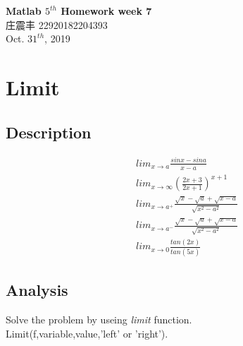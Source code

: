 \documentclass[UTF8,a4paper]{article}
\begin{document}
\begin{center}
    \textbf{\LARGE{Matlab $5^{th}$ Homework week 7}}\\[0.5cm]
    \normalsize{庄震丰 22920182204393}\\[0.5cm]
    \large{Oct. $31^{th}$, 2019}
\end{center}
\section{Limit}
\subsection{Description}
 
$$
\begin{aligned}
    &lim_{x \rightarrow a} \frac{sinx-sina}{x-a}\\
    &lim_{x\rightarrow \infty} (\frac{2x+3}{2x+1})^{x+1}\\
    &lim_{x\rightarrow a^{+}} \frac{\sqrt{x}-\sqrt{a}+\sqrt{x-a}}{\sqrt{x^2-a^2}}\\
    &lim_{x\rightarrow a^{-}} \frac{\sqrt{x}-\sqrt{a}+\sqrt{x-a}}{\sqrt{x^2-a^2}}\\
    &lim_{x\rightarrow 0} \frac{tan(2x)}{tan(5x)}
\end{aligned}
$$
\subsection{Analysis}
\noindent Solve the problem by useing \textit{limit} function.\\
Limit(f,variable,value,'left' or 'right').
\end{document}
